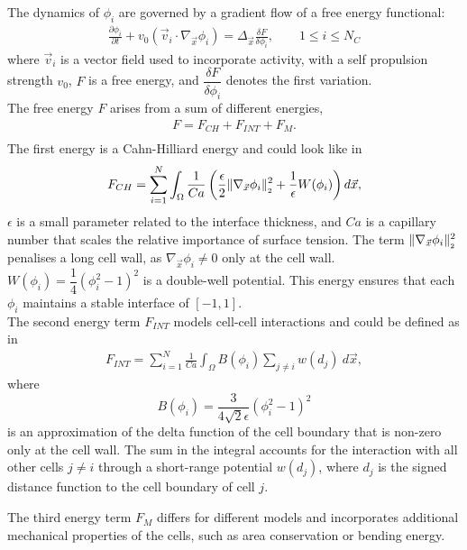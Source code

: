 The dynamics of $\phi_i$ are governed by a gradient flow of a free energy functional:
\begin{align*}
	\frac{\partial \phi_i}{\partial t} + v_0 (\vec{v}_i \cdot \nabla_{\vec{x}} \phi_i) = \Delta_{\vec{x}} \frac{\delta F}{\delta \phi_i}, \qquad 1 \leq i \leq N_C 
\end{align*}
where $\vec{v}_i$ is a vector field used to incorporate activity, with a self propulsion strength $v_0$, $F$ is a free energy, and $\dfrac{\delta F}{\delta \phi_i}$ denotes the first variation.\\
The free energy $F$ arises from a sum of different energies, 
\begin{align*}
	F = F_{CH} + F_{INT} + F_{M}. \\
\end{align*}
The first energy is a Cahn-Hilliard energy and could look like in~\cite{wenzel2021}
\begin{align*} 
	F_{CH} = \sum\limits_{i=1}^N \int_{\Omega} \dfrac{1}{Ca} \left( \dfrac{\epsilon}{2} \norm[\nabla_{\vec{x}} \phi_i]^2 + \dfrac{1}{\epsilon} W(\phi_i) \right) d\vec{x},
\end{align*}
$\epsilon$ is a small parameter related to the interface thickness, and $Ca$ is a capillary number that scales the relative importance of surface tension.
The term $\norm[\nabla_{\vec{x}} \phi_i]^2$ penalises a long cell wall, as $\nabla_{\vec{x}} \phi_i \neq 0$ only at the cell wall.
$W(\phi_i) = \dfrac{1}{4} (\phi_i^2 - 1)^2$ is a double-well potential. 
This energy ensures that each $\phi_i$ maintains a stable interface of $[-1,1]$.  \\ 
The second energy term $F_{INT}$ models cell-cell interactions and could be defined as in~\cite{wenzel2021}
\begin{align*}
	F_{INT} = \sum\limits_{i=1}^N \frac{1}{Ca} \int_{\Omega} B(\phi_i) \sum\limits_{j \neq i} w(d_j) \: d\vec{x},
\end{align*}
where 
\[B(\phi_i) = \dfrac{3}{4\sqrt{2}\epsilon} (\phi_i^2 - 1)^2\]
is an approximation of the delta function of the cell boundary that is non-zero only at the cell wall.
The sum in the integral accounts for the interaction with all other cells $j \neq i$ through a short-range potential $w(d_j)$, where $d_j$ is the signed distance function to the cell boundary of cell $j$.  

The third energy term $F_M$ differs for different models and incorporates additional mechanical properties of the cells, such as area conservation or bending energy.


